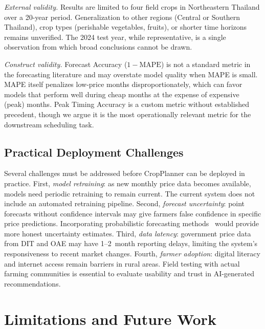 \documentclass[journal]{IEEEtran}
\begin{document}
\textit{External validity.} Results are limited to four field crops in Northeastern Thailand over a 20-year period. Generalization to other regions (Central or Southern Thailand), crop types (perishable vegetables, fruits), or shorter time horizons remains unverified. The 2024 test year, while representative, is a single observation from which broad conclusions cannot be drawn.

\textit{Construct validity.} Forecast Accuracy ($1 - \text{MAPE}$) is not a standard metric in the forecasting literature and may overstate model quality when MAPE is small. MAPE itself penalizes low-price months disproportionately, which can favor models that perform well during cheap months at the expense of expensive (peak) months. Peak Timing Accuracy is a custom metric without established precedent, though we argue it is the most operationally relevant metric for the downstream scheduling task.

\subsection{Practical Deployment Challenges}

Several challenges must be addressed before CropPlanner can be deployed in practice. First, \textit{model retraining}: as new monthly price data becomes available, models need periodic retraining to remain current. The current system does not include an automated retraining pipeline. Second, \textit{forecast uncertainty}: point forecasts without confidence intervals may give farmers false confidence in specific price predictions. Incorporating probabilistic forecasting methods~\cite{salinas2020deepar} would provide more honest uncertainty estimates. Third, \textit{data latency}: government price data from DIT and OAE may have 1--2~month reporting delays, limiting the system's responsiveness to recent market changes. Fourth, \textit{farmer adoption}: digital literacy and internet access remain barriers in rural areas. Field testing with actual farming communities is essential to evaluate usability and trust in AI-generated recommendations.

\section{Limitations and Future Work}
\label{sec:limfuture}
\end{document}
